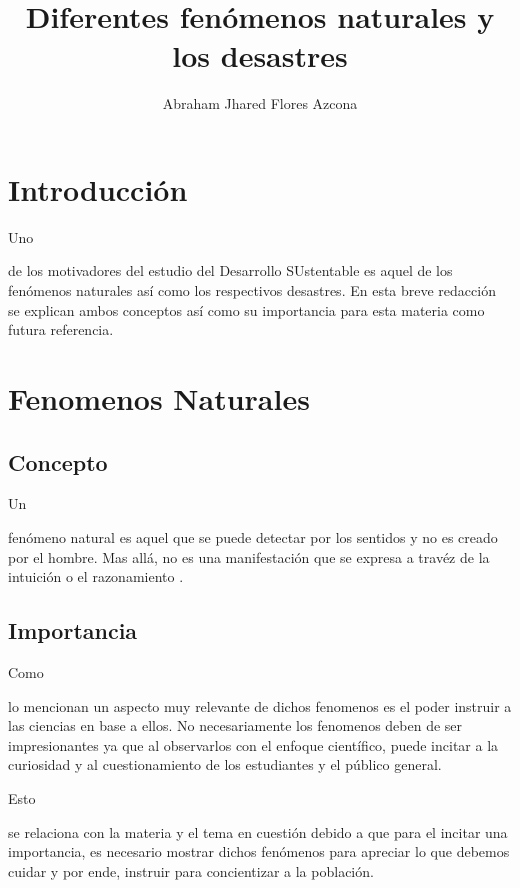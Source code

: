 \documentclass[stu, 12pt, letterpaper, donotrepeattitle, floatsintext, natbib]{apa7}
\title{\Large Diferentes fenómenos naturales y los desastres}
\author{Abraham Jhared Flores Azcona} %
\affiliation{Instituto Tecnológico de Tijuana}
\begin{document}
\maketitle


\renewcommand\contentsname{Contenido}
\tableofcontents

\newpage
\section*{Introducción}
Uno \begin{justifying}
   de los motivadores del estudio del Desarrollo SUstentable es aquel de los fenómenos naturales así como los respectivos desastres.
   En esta breve redacción se explican ambos conceptos así como su importancia para esta materia como futura referencia.\par
\end{justifying}
\vspace{\baselineskip}
\section{Fenomenos Naturales}
\subsection{Concepto}
Un \begin{justifying}
    fenómeno natural es aquel que se puede detectar por los sentidos y no es creado por el hombre. Mas allá,
    no es una manifestación que se expresa a travéz de la intuición o el razonamiento \citep{unknown-author-no-dateA}. \par %
\end{justifying}
\subsection{Importancia}
Como \begin{justifying}
    lo mencionan \citep{brown-no-date}%
    un aspecto muy relevante de dichos fenomenos es el poder instruir a las ciencias en base a ellos.
    No necesariamente los fenomenos deben de ser impresionantes ya que al observarlos con el enfoque científico,
    puede incitar a la curiosidad y al cuestionamiento de los estudiantes y el público general.\par
\end{justifying}
Esto \begin{justifying}
    se relaciona con la materia y el tema en cuestión debido a que para el incitar una importancia, es necesario mostrar
    dichos fenómenos para apreciar lo que debemos cuidar y por ende, instruir para concientizar a la población.\par
\end{justifying}
\vspace{\baselineskip}
\end{document}
